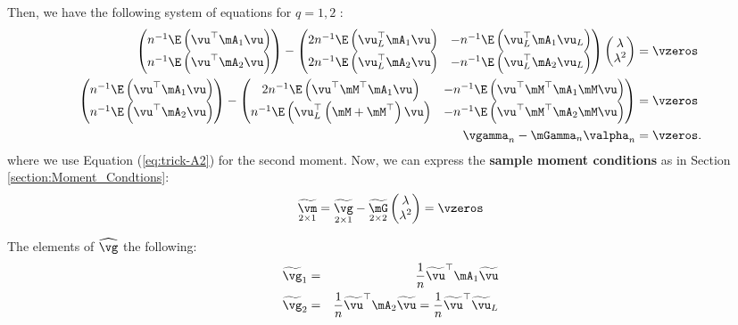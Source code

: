 \documentclass[english,12pt]{book}\usepackage[]{graphicx}\usepackage[]{xcolor}
\begin{document}
Then, we have the following system of equations for $q = 1, 2$ \citep[see][pag 56]{kelejian2010specification}:
\begin{equation}\label{eq:system-gmm-general}
\begin{aligned}
  \begin{pmatrix}
    n^{-1}\E\left(\vu^\top\mA_1\vu \right)  \\
    n^{-1}\E\left(\vu^\top\mA_2\vu \right) 
  \end{pmatrix} -
  \begin{pmatrix}
    2n^{-1}\E\left(\vu_L^\top\mA_1\vu\right) &   -n^{-1}\E\left(\vu_L^\top\mA_1\vu_L\right)   \\
    2n^{-1}\E\left(\vu_L^\top\mA_2\vu\right) &   -n^{-1}\E\left(\vu_L^\top\mA_2\vu_L\right)
  \end{pmatrix}
  \begin{pmatrix}
  \lambda \\
  \lambda^2
  \end{pmatrix}
  & = \vzeros \\
    \begin{pmatrix}
    n^{-1}\E\left(\vu^\top\mA_1\vu \right)   \\
    n^{-1}\E\left(\vu^\top\mA_2\vu \right) 
  \end{pmatrix}-
  \begin{pmatrix}
    2n^{-1}\E\left(\vu^\top\mM^\top\mA_1\vu\right) &   -n^{-1}\E\left(\vu^\top\mM^\top\mA_1\mM\vu\right)   \\
    n^{-1}\E\left(\vu_L^\top\left(\mM + \mM^\top\right)\vu\right) &   -n^{-1}\E\left(\vu^\top\mM^\top\mA_2\mM\vu\right)
  \end{pmatrix} & = \vzeros \\
  \vgamma_n - \mGamma_n\valpha_n &= \vzeros. 
\end{aligned}
\end{equation}
%
where we use Equation (\ref{eq:trick-A2}) for the second moment. Now, we can express the \textbf{sample moment conditions} as in Section \ref{section:Moment_Condtions}:
\begin{equation*}
	\underset{2 \times 1}{\widetilde{\vm}} = \underset{2 \times 1}{\widetilde{\vg}} - \underset{2 \times 2}{\widetilde{\mG}}\begin{pmatrix}\lambda \\ \lambda^2\end{pmatrix} = \vzeros
\end{equation*}

The elements of $\widehat{\vg}$ the following:
\begin{eqnarray*}
	\widetilde{\vg}_1  &=& \frac{1}{n}\widetilde{\vu}^\top\mA_1\widetilde{\vu} \\
\widetilde{\vg}_2  &=&  \frac{1}{n}\widetilde{\vu}^\top\mA_2\widetilde{\vu}   =  \frac{1}{n} \widetilde{\vu}^\top\widetilde{\vu}_L
\end{eqnarray*}
\end{document}
